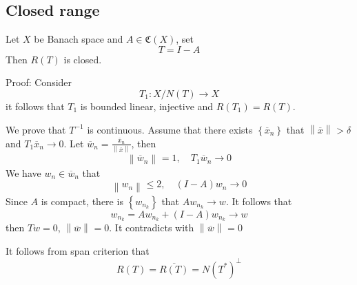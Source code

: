\documentclass[12pt, oneside]{book}
\begin{document}
\subsection{Closed range}
\begin{theorem}
    Let $X$ be Banach space and $A\in \mathfrak{C} (X)$, set
    \begin{equation*}
        T=I-A
    \end{equation*}
    Then $R(T)$ is closed.

    Proof: Consider
    \begin{equation*}
        T_1 : X/N(T) \rightarrow X
    \end{equation*}
    it follows that $T_1$ is bounded linear, injective and $R(T_1)=R(T)$.

    We prove that $T^{-1}$ is continuous. Assume that there exists $\left\{\overline{x}_n\right\} $ that $\left\| \overline{x} \right\|_{} > \delta$ and $T_1\overline{x}_n \to 0$. Let $\overline{w}_n = \frac{\overline{x}_n}{\left\| \overline{x} \right\|_{}}$, then
    \begin{equation*}
        \left\| \overline{w}_n \right\|_{}=1,\quad T_1 \overline{w}_n\to 0
    \end{equation*}
    We have $w_n \in \overline{w}_n$ that
    \begin{equation*}
        \left\| w_n \right\|_{}\leq 2, \quad (I-A)w_n \to 0
    \end{equation*}
    Since $A$ is compact, there is $\left\{w_{n_k}\right\}$ that $A w_{n_k} \to w$. It follows that
    \begin{equation*}
        w_{n_k} = Aw_{n_k} +(I-A) w_{n_k} \to w
    \end{equation*}
    then $Tw =0$, $\left\| \overline{w} \right\|_{}=0$. It contradicts with $\left\| \overline{w} \right\|_{} =0$
\end{theorem}

\begin{corollary}
    It follows from span criterion that
    \begin{equation*}
        R(T)=\overline{R(T)} = N(T^*)^\bot
    \end{equation*}
\end{corollary}
\end{document}
